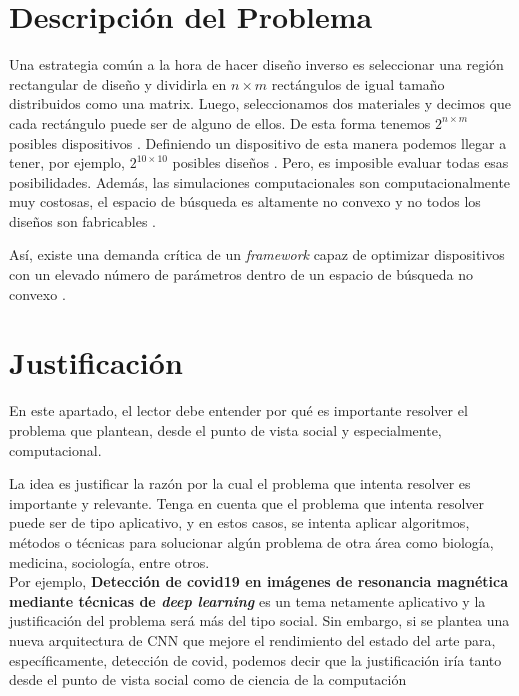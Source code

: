 \section{Descripción del  Problema}

Una estrategia común a la hora de hacer diseño inverso es seleccionar una región rectangular de diseño y dividirla en $n \times m$ rectángulos
de igual tamaño distribuidos como una matrix. 
Luego, seleccionamos dos materiales y decimos que cada rectángulo puede ser de alguno de ellos. 
De esta forma tenemos $2^{n \times m}$ posibles dispositivos \cite{Su2020}. 
Definiendo un dispositivo de esta manera podemos llegar a tener, por ejemplo, $2^{10 \times 10}$ posibles diseños \cite{Malheiros-Silveira2020}.
Pero, es imposible evaluar todas esas posibilidades. Además, las simulaciones computacionales son computacionalmente muy costosas, el espacio de búsqueda es altamente no convexo y no todos los diseños son fabricables \cite{Su2018, Su2020}.

Así, existe una demanda crítica de un \emph{framework} capaz de optimizar dispositivos con un elevado número de parámetros dentro de un espacio de búsqueda no convexo \cite{Kudyshev2020}.

\section{Justificación}
En este apartado, el lector debe entender por qué es importante resolver el problema que plantean, desde el punto de vista social y especialmente, computacional. 

La idea es  justificar la razón por la cual  el problema que intenta resolver es importante y relevante. 
Tenga en cuenta que el problema que intenta resolver puede ser de tipo aplicativo, y  en estos casos, se intenta aplicar algoritmos, métodos o técnicas para solucionar algún problema de otra área como
biología, medicina, sociología, entre otros. \\

Por ejemplo, \textbf{Detección de covid19 en imágenes de resonancia magnética   mediante técnicas de \textit{deep learning}} es un tema netamente aplicativo y la justificación del problema será  más del tipo social. Sin embargo, si se plantea una nueva arquitectura de CNN que mejore el rendimiento del estado del arte para, específicamente, detección de covid, podemos decir que la justificación iría tanto desde el punto de vista social como de ciencia de la computación \\


